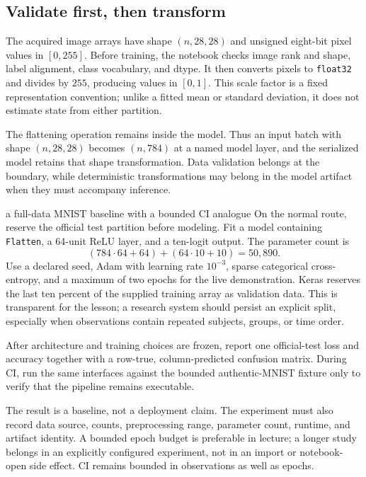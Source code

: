\subsection{Validate first, then transform}

The acquired image arrays have shape $(n,28,28)$ and unsigned eight-bit pixel
values in $[0,255]$. Before training, the notebook checks image rank and shape,
label alignment, class vocabulary, and dtype. It then converts pixels to
\texttt{float32} and divides by $255$, producing values in $[0,1]$. This scale
factor is a fixed representation convention; unlike a fitted mean or standard
deviation, it does not estimate state from either partition.

The flattening operation remains inside the model. Thus an input batch with
shape $(n,28,28)$ becomes $(n,784)$ at a named model layer, and the serialized
model retains that shape transformation. Data validation belongs at the
boundary, while deterministic transformations may belong in the model artifact
when they must accompany inference.

\begin{workedexample}{a full-data MNIST baseline with a bounded CI analogue}
On the normal route, reserve the official test partition before modeling. Fit a
model containing \texttt{Flatten}, a 64-unit ReLU layer, and a ten-logit
output. The parameter count is
\[
  (784\cdot64+64)+(64\cdot10+10)=50{,}890.
\]
Use a declared seed, Adam with learning rate $10^{-3}$, sparse categorical
cross-entropy, and a maximum of two epochs for the live demonstration. Keras
reserves the last ten percent of the supplied training array as validation
data. This is transparent for the lesson; a research system should persist an
explicit split, especially when observations contain repeated subjects,
groups, or time order.

After architecture and training choices are frozen, report one official-test
loss and accuracy together with a row-true, column-predicted confusion matrix.
During CI, run the same interfaces against the bounded authentic-MNIST fixture
only to verify that the pipeline remains executable.

The result is a baseline, not a deployment claim. The experiment must also
record data source, counts, preprocessing range, parameter count, runtime, and
artifact identity. A bounded epoch budget is preferable in lecture; a longer
study belongs in an explicitly configured experiment, not in an import or
notebook-open side effect. CI remains bounded in observations as well as
epochs.
\end{workedexample}


